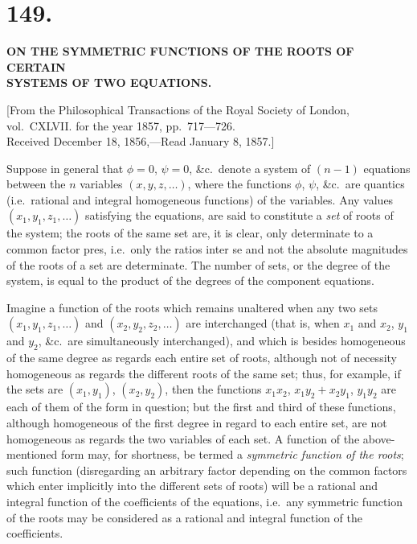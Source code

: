 \documentclass[11pt,a4paper]{article}
\begin{document}
\newpage
\section*{149.}
\begin{center}
\Large\bfseries
ON THE SYMMETRIC FUNCTIONS OF THE ROOTS OF CERTAIN\\SYSTEMS OF TWO EQUATIONS.
\end{center}

\begin{flushright}
\small
[From the Philosophical Transactions of the Royal Society of London,\\
vol.~CXLVII. for the year 1857, pp.~717---726.\\
Received December 18, 1856,---Read January 8, 1857.]
\end{flushright}

\normalsize

Suppose in general that $\phi = 0$, $\psi = 0$, \&c.\ denote a system of
$(n - 1)$ equations between the $n$ variables $(x, y, z, \ldots)$, where the
functions $\phi$, $\psi$, \&c.\ are quantics (i.e.\ rational and integral
homogeneous functions) of the variables. Any values $(x_1, y_1, z_1, \ldots)$
satisfying the equations, are said to constitute a \emph{set} of roots of the
system; the roots of the same set are, it is clear, only determinate to a
common factor pres, i.e.\ only the ratios inter se and not the absolute
magnitudes of the roots of a set are determinate. The number of sets, or the
degree of the system, is equal to the product of the degrees of the component
equations.

Imagine a function of the roots which remains unaltered when any two sets
$(x_1, y_1, z_1, \ldots)$ and $(x_2, y_2, z_2, \ldots)$ are interchanged
(that is, when $x_1$ and $x_2$, $y_1$ and $y_2$, \&c.\ are simultaneously
interchanged), and which is besides homogeneous of the same degree as regards
each entire set of roots, although not of necessity homogeneous as regards the
different roots of the same set; thus, for example, if the sets are
$(x_1, y_1)$, $(x_2, y_2)$, then the functions $x_1 x_2$,
$x_1 y_2 + x_2 y_1$, $y_1 y_2$ are each of them of the form in question; but
the first and third of these functions, although homogeneous of the first
degree in regard to each entire set, are not homogeneous as regards the two
variables of each set. A function of the above-mentioned form may, for
shortness, be termed a \emph{symmetric function of the roots}; such function
(disregarding an arbitrary factor depending on the common factors which enter
implicitly into the different sets of roots) will be a rational and integral
function of the coefficients of the equations, i.e.\ any symmetric function of
the roots may be considered as a rational and integral function of the
coefficients.
\end{document}
